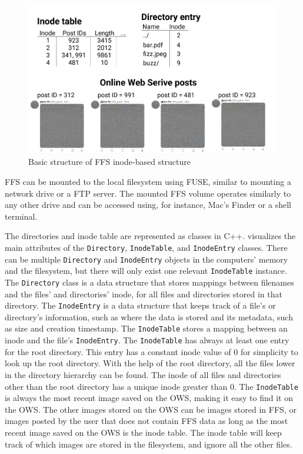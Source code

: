 \begin{figure}[!ht]
	\begin{center}
	  \includegraphics[width=0.99\textwidth]{figures.nosync/ffs_inode_diagram.png}
	\end{center}
	\caption{Basic structure of \gls{FFS} \mbox{inode-based} structure}
	\label{fig:ffs_inode_diag}
\end{figure}
\FloatBarrier
\newpage
\gls{FFS} can be mounted to the local filesystem using \gls{FUSE}, similar to mounting a network drive or a \gls{FTP} server. The mounted \gls{FFS} volume operates similarly to any other drive and can be accessed using, for instance, Mac's Finder or a shell terminal.

The directories and inode table are represented as classes in C++.  visualizes the main attributes of the \texttt{Directory}, \texttt{InodeTable}, and \texttt{InodeEntry} classes. There can be multiple \texttt{Directory} and \texttt{InodeEntry} objects in the computers' memory and the filesystem, but there will only exist one relevant \texttt{InodeTable} instance. The \texttt{Directory} class is a data structure that stores mappings between filenames and the files' and directories' inode, for all files and directories stored in that directory. The \texttt{InodeEntry} is a data structure that keeps track of a file's or directory's information, such as where the data is stored and its metadata, such as size and creation timestamp. The \texttt{InodeTable} stores a mapping between an inode and the file's \texttt{InodeEntry}. The \texttt{InodeTable} has always at least one entry for the root directory. This entry has a constant inode value of 0 for simplicity to look up the root directory. With the help of the root directory, all the files lower in the directory hierarchy can be found. The inode of all files and directories other than the root directory has a unique inode greater than 0. The \texttt{InodeTable} is always the most recent image saved on the \gls{OWS}, making it easy to find it on the \gls{OWS}. The other images stored on the \gls{OWS} can be images stored in \gls{FFS}, or images posted by the user that does not contain \gls{FFS} data as long as the most recent image saved on the \gls{OWS} is the inode table. The inode table will keep track of which images are stored in the filesystem, and ignore all the other files.

